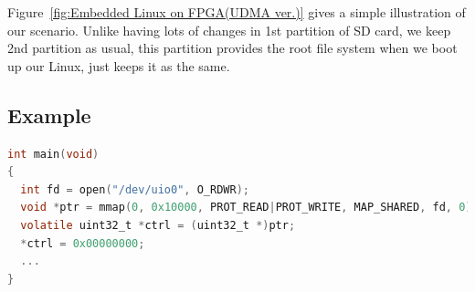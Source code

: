 Figure~\ref{fig:Embedded Linux on FPGA(UDMA ver.)} gives a simple illustration of our scenario. Unlike having lots of changes in 1st partition of SD card, we keep 2nd partition as usual, this partition provides the root file system when we boot up our Linux, just keeps it as the same.

\subsection{Example}
\label{subsec:Example}

{\renewcommand\baselinestretch{0.8}\selectfont
\begin{lstlisting}[frame=single,language=C]
int main(void)
{
  int fd = open("/dev/uio0", O_RDWR);
  void *ptr = mmap(0, 0x10000, PROT_READ|PROT_WRITE, MAP_SHARED, fd, 0);
  volatile uint32_t *ctrl = (uint32_t *)ptr;
  *ctrl = 0x00000000;
  ...
}
\end{lstlisting}
\par}
